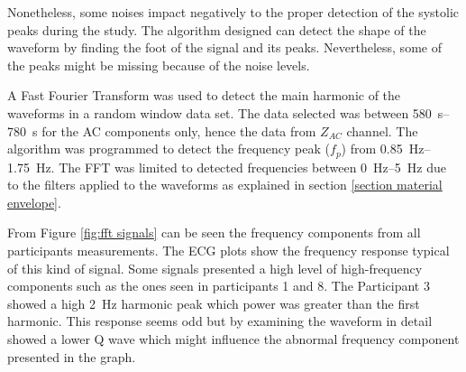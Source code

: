 Nonetheless, some noises impact negatively to the proper detection of the systolic peaks during the study. The algorithm designed can detect the shape of the waveform by finding the foot of the signal and its peaks. Nevertheless, some of the peaks might be missing because of the noise levels.

A Fast Fourier Transform was used to detect the main harmonic of the waveforms in a random window data set. The data selected was between \SIrange{580}{780}{\second} for the AC components only, hence the data from $Z_{AC}$ channel. The algorithm was programmed to detect the frequency peak ($f_p$) from \SIrange{0.85}{1.75}{\hertz}. The FFT was limited to detected frequencies between \SIrange{0}{5}{\hertz} due to the filters applied to the waveforms as explained in section \ref{section material envelope}.

From Figure \ref{fig:fft signals} can be seen the frequency components from all participants measurements. The ECG plots show the frequency response typical of this kind of signal. Some signals presented a high level of high-frequency components such as the ones seen in participants 1 and 8. The Participant 3 showed a high \SI{2}{\hertz} harmonic peak which power was greater than the first harmonic. This response seems odd but by examining the waveform in detail showed a lower Q wave which might influence the abnormal frequency component presented in the graph.

